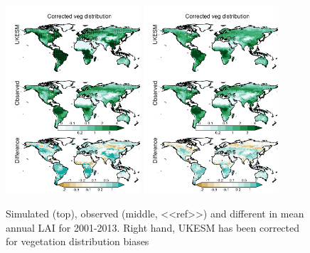 \begin{figure}[t]
        \includegraphics[width=5cm]{figs/LAI/fire_var_seasonality-maps-AA-mapscontrol-lai.png}
        \includegraphics[width=5cm]{figs/LAI/fire_var_seasonality-maps-AA-mapsobsVegDist-lai.png}
    
    \caption{Simulated (top), observed (middle, <<ref>>) and different in mean annual LAI for 2001-2013. Right hand, UKESM has been corrected for vegetation distribution biases \label{fig:LAImap}}
\end{figure}


